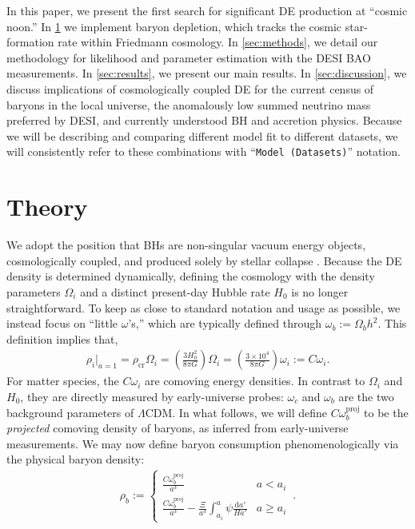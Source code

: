 \documentclass[a4paper,11pt]{article}
\renewcommand{\d}[0]{\mathrm{d}}
\begin{document}
In this paper, we present the first search for significant DE production at ``cosmic noon.''
In \cref{sec:theory} we implement baryon depletion, which tracks the cosmic star-formation rate within Friedmann cosmology.
In \cref{sec:methods}, we detail our methodology for likelihood and parameter estimation with the DESI BAO measurements.
In \cref{sec:results}, we present our main results.
In \cref{sec:discussion}, we discuss implications of cosmologically coupled DE for the current census of baryons in the local universe, the anomalously low summed neutrino mass preferred by DESI, and currently understood BH and accretion physics.
Because we will be describing and comparing different model fit to different datasets, we will consistently refer to these combinations with ``\texttt{Model (Datasets)}'' notation.

\section{Theory}
\label{sec:theory}
We adopt the position that BHs are non-singular vacuum energy objects, cosmologically coupled, and produced solely by stellar collapse \cite[c.f.][]{Privya2024}.
Because the DE density is determined dynamically, defining the cosmology with the density parameters $\Omega_i$ and a distinct present-day Hubble rate $H_0$ is no longer straightforward.
To keep as close to standard notation and usage as possible, we instead focus on ``little $\omega$'s,'' which are typically defined through $\omega_b := \Omega_b h^2$.
This definition implies that,
\begin{align}
  \rho_i\bigg|_{a=1} = \rho_\mathrm{cr} \Omega_i = \left(\frac{3H_0^2}{8\pi G}\right)\Omega_i = \left(\frac{3\times10^4}{8\pi G}\right) \omega_i := C\omega_i.
\end{align}
For matter species, the $C\omega_i$ are comoving energy densities. 
In contrast to $\Omega_i$ and $H_0$, they are directly measured by early-universe probes: $\omega_c$ and $\omega_b$ are the two background parameters of $\Lambda$CDM.
In what follows, we will define $C\omega_b^\mathrm{proj}$ to be the \emph{projected} comoving density of baryons, as inferred from early-universe measurements.
We may now define baryon consumption phenomenologically via the physical baryon density:
\begin{align}
  \rho_b := \begin{cases}
    \displaystyle \frac{C\omega_b^\mathrm{proj}}{a^3} & a < a_i \\
    \displaystyle \frac{C\omega_b^\mathrm{proj}}{a^3} - \frac{\Xi}{a^3}\int_{a_i}^a \psi\frac{\d a'}{Ha'} & a \geqslant a_i
  \end{cases}\,.\label{eqn:rho_b_defn}
\end{align}
\end{document}
